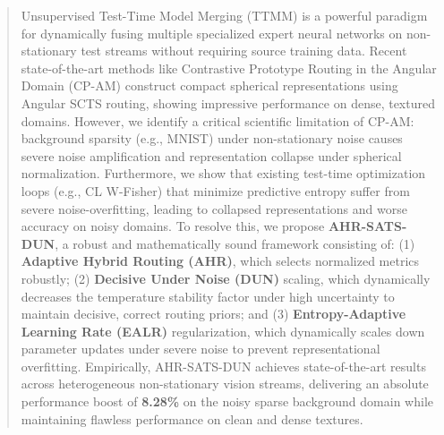 \documentclass{article}
\theoremstyle{plain}
\theoremstyle{definition}
\theoremstyle{remark}
\begin{document}

\printAffiliationsAndNotice{}

\begin{abstract}
Unsupervised Test-Time Model Merging (TTMM) is a powerful paradigm for dynamically fusing multiple specialized expert neural networks on non-stationary test streams without requiring source training data. Recent state-of-the-art methods like Contrastive Prototype Routing in the Angular Domain (CP-AM) construct compact spherical representations using Angular SCTS routing, showing impressive performance on dense, textured domains. However, we identify a critical scientific limitation of CP-AM: background sparsity (e.g., MNIST) under non-stationary noise causes severe noise amplification and representation collapse under spherical normalization. Furthermore, we show that existing test-time optimization loops (e.g., CL W-Fisher) that minimize predictive entropy suffer from severe noise-overfitting, leading to collapsed representations and worse accuracy on noisy domains. To resolve this, we propose \textbf{AHR-SATS-DUN}, a robust and mathematically sound framework consisting of: (1) \textbf{Adaptive Hybrid Routing (AHR)}, which selects normalized metrics robustly; (2) \textbf{Decisive Under Noise (DUN)} scaling, which dynamically decreases the temperature stability factor under high uncertainty to maintain decisive, correct routing priors; and (3) \textbf{Entropy-Adaptive Learning Rate (EALR)} regularization, which dynamically scales down parameter updates under severe noise to prevent representational overfitting. Empirically, AHR-SATS-DUN achieves state-of-the-art results across heterogeneous non-stationary vision streams, delivering an absolute performance boost of \textbf{8.28\%} on the noisy sparse background domain while maintaining flawless performance on clean and dense textures.
\end{abstract}
\end{document}
